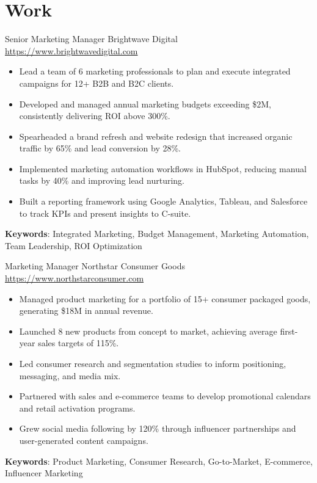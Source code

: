 \documentclass[a4paper, serif, 10pt]{moderncv}
\begin{document}
\section{Work}

        {Senior Marketing Manager}
        {Brightwave Digital}
        {\url{https://www.brightwavedigital.com}}
        {}
        {\begin{itemize}
\item Lead a team of 6 marketing professionals to plan and execute integrated campaigns for 12+ B2B and B2C clients.
\item Developed and managed annual marketing budgets exceeding \$2M, consistently delivering ROI above 300\%.
\item Spearheaded a brand refresh and website redesign that increased organic traffic by 65\% and lead conversion by 28\%.
\item Implemented marketing automation workflows in HubSpot, reducing manual tasks by 40\% and improving lead nurturing.
\item Built a reporting framework using Google Analytics, Tableau, and Salesforce to track KPIs and present insights to C-suite.
\end{itemize}
\textbf{Keywords}: Integrated Marketing, Budget Management, Marketing Automation, Team Leadership, ROI Optimization}

        {Marketing Manager}
        {Northstar Consumer Goods}
        {\url{https://www.northstarconsumer.com}}
        {}
        {\begin{itemize}
\item Managed product marketing for a portfolio of 15+ consumer packaged goods, generating \$18M in annual revenue.
\item Launched 8 new products from concept to market, achieving average first-year sales targets of 115\%.
\item Led consumer research and segmentation studies to inform positioning, messaging, and media mix.
\item Partnered with sales and e-commerce teams to develop promotional calendars and retail activation programs.
\item Grew social media following by 120\% through influencer partnerships and user-generated content campaigns.
\end{itemize}
\textbf{Keywords}: Product Marketing, Consumer Research, Go-to-Market, E-commerce, Influencer Marketing}
\end{document}
